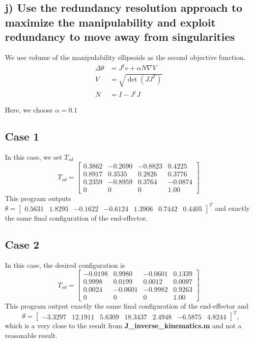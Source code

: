 \documentclass[english,10pt,a4paper]{article}
\begin{document}
    \subsection*{j) Use the redundancy resolution approach to maximize the manipulability and exploit redundancy to move away from singularities}
    We use volume of the manipulability ellipsoids as the second objective function.
    \begin{align}
    	\Delta\theta &= J^\dagger e + \alpha N \nabla V\\ \nonumber
    	V &= \sqrt{\det(J J^T)} \\
    	N &= I - J^\dagger J
    \end{align}
	
	Here, we choose $\alpha = 0.1$
	\subsection*{Case 1}
	In this case, we set $T_{sd}$
	\begin{equation}
		T_{sd} = \begin{bmatrix}
			0.3862 & -0.2690 & -0.8823 & 0.4225\\
			0.8917 & 0.3535 & 0.2826 & 0.3776\\
			0.2359 & -0.8959 & 0.3764 &  -0.0874\\
			0 & 0 & 0 & 1.00
		\end{bmatrix}
	\end{equation}
	This program outputs \(\theta = \begin{bmatrix} 0.5631 & 1.8295 & -0.1622 & -0.6124 & 1.3906 & 0.7442 & 0.4405 \end{bmatrix}^T\) and exactly the same final configuration of the end-effector.
	
	\subsection*{Case 2}
	In this case, the desired configuration is
	\begin{equation}
		T_{sd} = \begin{bmatrix}
			-0.0198 & 0.9980 & -0.0601 & 0.1339\\
			0.9998 & 0.0199 & 0.0012 & 0.0097\\
			0.0024 & -0.0601 & -0.9982 & 0.9263\\
			0 & 0 & 0 & 1.00
		\end{bmatrix}
	\end{equation}
	This program output exactly the same final configuration of the end-effector and \ \ \ \ \ \(\theta = \begin{bmatrix} -3.3297 & 12.1911 & 5.6309 & 18.3437 & 2.4948 & -6.5875 & 4.8244 \end{bmatrix}^T\), which is a very close to the result from \textbf{J\_inverse\_kinematics.m} and not a reasonable result.
	
\end{document}
